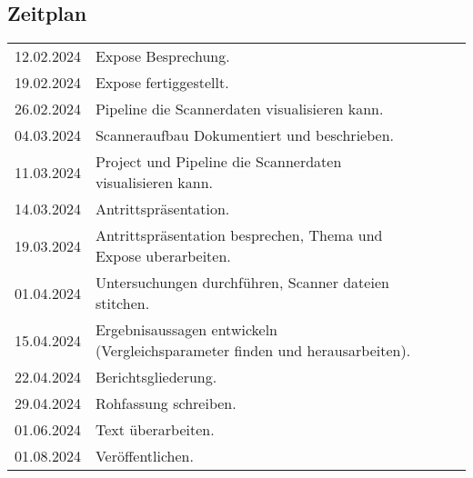 \documentclass[../main.tex]{subfiles}
\begin{document}
\begin{table}[h]
    \subsection*{Zeitplan}
    \begin{tabular}{lllll}
    \multicolumn{1}{r}{12.02.2024} & Expose Besprechung.                                                          &  &  &  \\
    \multicolumn{1}{r}{19.02.2024} & Expose fertiggestellt.                                                      &  &  &  \\
    \multicolumn{1}{r}{26.02.2024} & Pipeline die Scannerdaten visualisieren kann.                               &  &  &  \\
    \multicolumn{1}{r}{04.03.2024} & Scanneraufbau Dokumentiert und beschrieben.                          &  &  &  \\
    \multicolumn{1}{r}{11.03.2024} & Project und Pipeline die Scannerdaten visualisieren kann.                 &  &  &  \\
    \multicolumn{1}{r}{14.03.2024} & Antrittspräsentation.                                                        &  &  &  \\
    \multicolumn{1}{r}{19.03.2024} & Antrittspräsentation besprechen, Thema und Expose uberarbeiten.              &  &  &  \\
    \multicolumn{1}{r}{01.04.2024} & Untersuchungen durchführen, Scanner dateien stitchen.                        &  &  &  \\
    \multicolumn{1}{r}{15.04.2024} & Ergebnisaussagen entwickeln (Vergleichsparameter finden und herausarbeiten). &  &  &  \\
    \multicolumn{1}{r}{22.04.2024} & Berichtsgliederung.                                                          &  &  &  \\
    \multicolumn{1}{r}{29.04.2024} & Rohfassung schreiben.                                                        &  &  &  \\
    \multicolumn{1}{r}{01.06.2024} & Text überarbeiten.                                                           &  &  &  \\
    \multicolumn{1}{r}{01.08.2024} & Veröffentlichen.                                                            &  &  & 
    \end{tabular}
\end{table}
\end{document}
